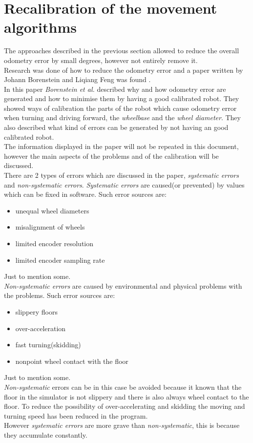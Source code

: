 \section{Recalibration of the movement algorithms}
The approaches described in the previous section allowed to reduce the overall odometry error by small degrees, however not entirely remove it. \\
Research was done of how to reduce the odometry error and a paper written by Johann Borenstein and Liqiang Feng was found \cite{Borenstein1996Measurement}.\\

In this paper \textit{Borenstein et al.} described why and how odometry error are generated and how to minimise them by having a good calibrated robot.
They showed ways of calibration the parts of the robot which cause odometry error when turning and driving forward, the \textit{wheelbase} and the \textit{wheel diameter}.
They also described what kind of errors can be generated by not having an good calibrated robot.\\
The information displayed in the paper will not be repeated in this document, however the main aspects of the problems and of the calibration will be discussed.\\

There are 2 types of errors which are discussed in the paper, \textit{systematic errors} and \textit{non-systematic errors}. \textit{Systematic errors} are caused(or prevented) by values which can be fixed in software. Such error sources are: \\
\begin{itemize}
\item unequal wheel diameters
\item misalignment of wheels
\item limited encoder resolution
\item limited encoder sampling rate
\end{itemize}
Just to mention some. \\
\textit{Non-systematic errors} are caused by environmental and physical problems with the problems.
Such error sources are:\\
\begin{itemize}
\item slippery floors
\item over-acceleration
\item fast turning(skidding)
\item nonpoint wheel contact with the floor
\end{itemize}
Just to mention some.\\
\textit{Non-systematic} errors can be in this case be avoided because it known that the floor in the simulator is not slippery and there is also always wheel contact to the floor. To reduce the possibility of over-accelerating and skidding the moving and turning speed has been reduced in the program.\\
However \textit{systematic errors} are more grave than \textit{non-systematic}, this is because they accumulate constantly.\\[3ex]

